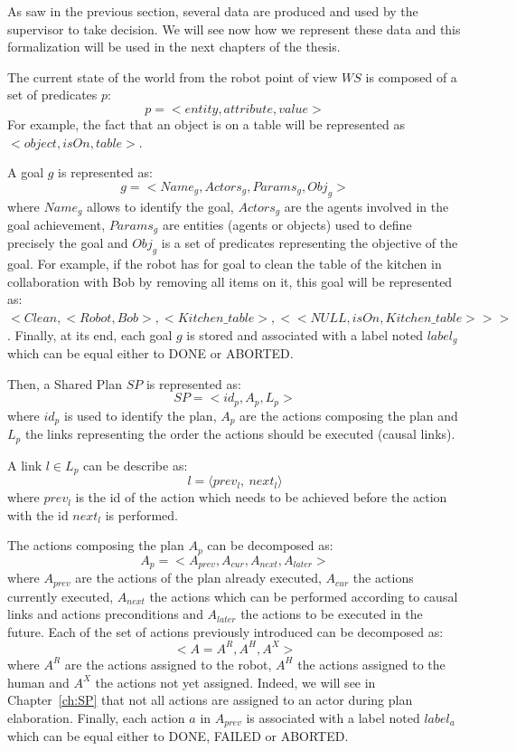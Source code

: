\documentclass[english,a4paper,11pt,twoside]{StyleThese}
\begin{document}
\label{sec:data}

As saw in the previous section, several data are produced and used by the supervisor to take decision. We will see now how we represent these data and this formalization will be used in the next chapters of the thesis.

The current state of the world from the robot point of view $WS$ is composed of a set of predicates $p$:
$$p = <entity, attribute, value>$$
For example, the fact that an object is on a table will be represented as $<object, isOn, table>$.

A goal $g$ is represented as:
$$g = <Name_g, Actors_g, Params_g, Obj_g>$$
where $Name_g$ allows to identify the goal, $Actors_g$ are the agents involved in the goal achievement, $Params_g$ are entities  (agents or objects) used to define precisely the goal and $Obj_g$ is a set of predicates representing the objective of the goal.
For example, if the robot has for goal to clean the table of the kitchen in collaboration with Bob by removing all items on it, this goal will be represented as:
$<Clean, <Robot, Bob>, <Kitchen\_table>, <<NULL, isOn, Kitchen\_table>>>$.
Finally, at its end, each goal $g$ is stored and associated with a label noted $label_g$ which can be equal either to DONE or ABORTED.

Then, a Shared Plan $SP$ is represented as:
$$SP = <id_p, A_p, L_p>$$
where $id_p$ is used to identify the plan, $A_p$ are the actions composing the plan and $L_p$ the links representing the order the actions should be executed (causal links).

A link $l \in L_p$ can be describe as:
 $$l = \langle prev_l, \ next_l \rangle$$
where $prev_l$ is the id of the action which needs to be achieved before the action with the id $next_l$ is performed. 

The actions composing the plan $A_p$ can be decomposed as:
$$A_p = <A_{prev}, A_{cur}, A_{next}, A_{later}>$$
where $A_{prev}$ are the actions of the plan already executed, $A_{cur}$ the actions currently executed, $A_{next}$ the actions which can be performed according to causal links and actions preconditions and $A_{later}$ the actions to be executed in the future.
Each of the set of actions previously introduced can be decomposed as:
$$<A = A^R, A^H, A^X>$$
where $A^R$ are the actions assigned to the robot, $A^H$ the actions assigned to the human and $A^X$ the actions not yet assigned. Indeed, we will see in Chapter~\ref{ch:SP} that not all actions are assigned to an actor during plan elaboration.
Finally, each action $a$ in $A_{prev}$ is associated with a label noted $label_a$ which can be equal either to DONE, FAILED or ABORTED.
\end{document}
